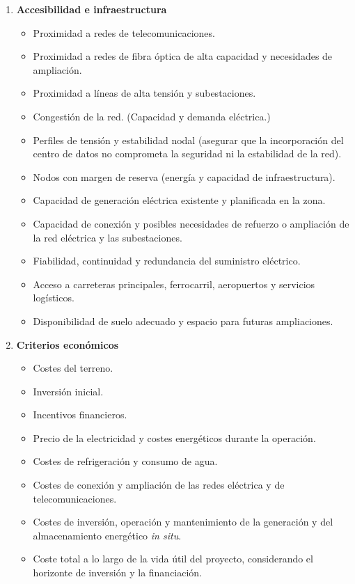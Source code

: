 \begin{enumerate}[label=\arabic*. ,leftmargin=*,itemsep=1em]
    \item \textbf{Accesibilidad e infraestructura}
    \begin{itemize}[leftmargin=*,nosep]
        \item Proximidad a redes de telecomunicaciones.
        \item Proximidad a redes de fibra óptica de alta capacidad y necesidades de ampliación. %
        \item Proximidad a líneas de alta tensión y subestaciones.
        \item Congestión de la red. (Capacidad y demanda eléctrica.)
        \item Perfiles de tensión y estabilidad nodal (asegurar que la incorporación del centro de datos no comprometa la seguridad ni la estabilidad de la red).
        \item Nodos con margen de reserva (energía y capacidad de infraestructura).
        \item Capacidad de generación eléctrica existente y planificada en la zona. %
        \item Capacidad de conexión y posibles necesidades de refuerzo o ampliación de la red eléctrica y las subestaciones. %
        \item Fiabilidad, continuidad y redundancia del suministro eléctrico. %
        
        \item Acceso a carreteras principales, ferrocarril, aeropuertos y servicios logísticos. %
        \item Disponibilidad de suelo adecuado y espacio para futuras ampliaciones. %
    \end{itemize}

    \item \textbf{Criterios económicos}
    \begin{itemize}[leftmargin=*,nosep]
        \item Costes del terreno.
        \item Inversión inicial.
        \item Incentivos financieros.
        \item Precio de la electricidad y costes energéticos durante la operación. %
        \item Costes de refrigeración y consumo de agua. %
        \item Costes de conexión y ampliación de las redes eléctrica y de telecomunicaciones. %
        \item Costes de inversión, operación y mantenimiento de la generación y del almacenamiento energético \textit{in situ}. %
        \item Coste total a lo largo de la vida útil del proyecto, considerando el horizonte de inversión y la financiación. %
    \end{itemize}


\end{enumerate}
